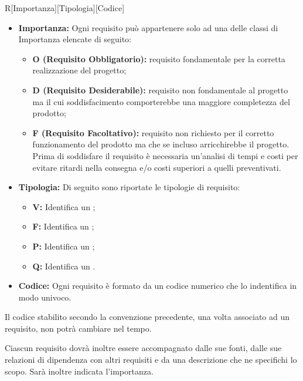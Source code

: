 \documentclass[../NomeDocumento.tex]{subfiles}
\begin{document}
	\begin{center}
		R[Importanza][Tipologia][Codice]
	\end{center}
		\begin{itemize}
			\item \textbf{Importanza:} Ogni requisito può appartenere solo ad una delle classi di Importanza elencate di seguito:
			\begin{itemize}
				\item \textbf{O (Requisito Obbligatorio):} requisito fondamentale per la corretta realizzazione del progetto;
				\item \textbf{D (Requisito Desiderabile):} requisito non fondamentale al progetto ma il cui soddisfacimento comporterebbe una maggiore completezza del prodotto;
				\item \textbf{F (Requisito Facoltativo):} requisito non richiesto per il corretto funzionamento del prodotto ma che se incluso arricchirebbe il progetto. Prima di soddisfare il requisito è necessaria un’analisi di tempi e costi per evitare ritardi nella consegna e/o costi superiori a quelli preventivati.
			\end{itemize}
			\item \textbf{Tipologia:} Di seguito sono riportate le tipologie di requisito:
			\begin{itemize}
				\item \textbf{V:} Identifica un ;
				\item \textbf{F:} Identifica un ;
				\item \textbf{P:} Identifica un ;
				\item \textbf{Q:} Identifica un .
			\end{itemize}
		\item \textbf{Codice:} Ogni requisito è formato da un codice numerico che lo indentifica in modo univoco.
		\end{itemize}
	
	\noindent Il codice stabilito secondo la convenzione precedente, una volta associato ad un requisito, non potrà cambiare nel tempo.
	
	\noindent Ciascun requisito dovrà inoltre essere accompagnato dalle sue fonti, dalle sue relazioni di dipendenza con altri requisiti e da una descrizione che ne specifichi lo scopo. Sarà inoltre indicata l'importanza.\\
	
\end{document}
